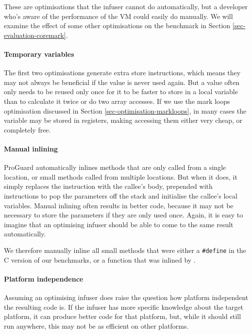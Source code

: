 These are optimisations that the infuser cannot do automatically, but a developer who's aware of the performance of the VM could easily do manually. We will examine the effect of some other optimisations on the  benchmark in Section \ref{sec-evaluation-coremark}.

\paragraph{Temporary variables}
The first two optimisations generate extra store instructions, which means they may not always be beneficial if the value is never used again. But a value often only needs to be reused only once for it to be faster to store in a local variable than to calculate it twice or do two array accesses. If we use the mark loops optimisation discussed in Section \ref{sec-optimisation-markloops}, in many cases the variable may be stored in registers, making accessing them either very cheap, or completely free.

\paragraph{Manual inlining}
ProGuard automatically inlines methods that are only called from a single location, or small methods called from multiple locations. But when it does, it simply replaces the  instruction with the callee's body, prepended with  instructions to pop the parameters off the stack and initialise the callee's local variables. Manual inlining often results in better code, because it may not be necessary to store the parameters if they are only used once. Again, it is easy to imagine that an optimising infuser should be able to come to the same result automatically.

We therefore manually inline all small methods that were either a \texttt{\#define} in the C version of our benchmarks, or a function that was inlined by .



\paragraph{Platform independence}
Assuming an optimising infuser does raise the question how platform independent the resulting code is. If the infuser has more specific knowledge about the target platform, it can produce better code for that platform, but, while it should still run anywhere, this may not be as efficient on other platforms.


